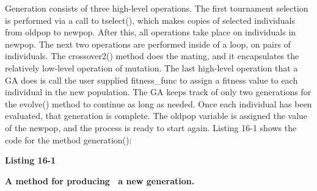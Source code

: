 
Generation consists of three high-level operations. The first tournament
selection is performed via a call to \textsf{tselect()}, which makes
copies of selected individuals from \textsf{oldpop} to \textsf{newpop}.
After this, all operations take place on individuals in
\textsf{newpop}. The next two operations are performed inside of a
loop, on pairs of individuals. The \textsf{crossover2()} method does
the mating, and it encapsulates the relatively low-level operation of
mutation. The last high-level operation that a GA does is call the user
supplied \textsf{fitness\_func} to assign a fitness value to each
individual in the new population. The GA keeps track of only two
generations for the \textsf{evolve()} method to continue as long as
needed. Once each individual has been evaluated, that generation is
complete. The \textsf{oldpop} variable is assigned the value of the
\textsf{newpop}, and the process is ready to start again. Listing 16-1
shows the code for the method \textsf{generation()}:

\bigskip

{\sffamily\bfseries
Listing 16-1}

{\sffamily\bfseries
A method for producing \ a new generation.}

